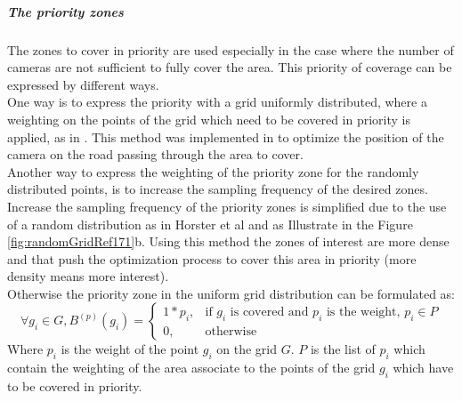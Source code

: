 \subparagraph{The priority zones}
The zones to cover in priority are used especially in the case where the number of cameras are not sufficient to fully cover the area. This priority of coverage can be expressed by different ways. \\
One way is to express  the priority with a grid uniformly distributed, where a  weighting on the points of the grid which need to be covered in priority is applied, as in \cite{141*akbarzadeh2013,84*xu2011}.
 This method was implemented in \citep{141*akbarzadeh2013} to optimize the position of the camera on the road passing through the area to cover. \\
Another way to  express the  weighting of the priority zone  for  the randomly distributed points, is  to increase the sampling frequency of the desired zones. Increase the sampling frequency of the priority zones is simplified due to the use of a random distribution as in Horster et al \citep{171*horster2006} and as Illustrate in the Figure \ref{fig:randomGridRef171}b.
 Using this method the zones of interest are more dense and that push the optimization process to cover this area in priority (more density means more interest).\\
Otherwise the priority zone in the uniform grid distribution can be formulated as: 
  \begin{equation}\label{eq:PciP}
\forall g_i \in G, B^{(p)}(g_i)= \begin{cases} 1*p_i, & \mbox{if } g_i\mbox{ is covered and  $p_i$ is the weight, }p_i \in P  \\ 0, & \mbox{otherwise}  \end{cases}
\end{equation}
Where $p_i$ is the weight of the point $g_i$ on the grid $G$. $P $ is the list of $p_i$ which contain the weighting of the area associate to the points of the grid $g_i$ which have to be covered in priority. \\

